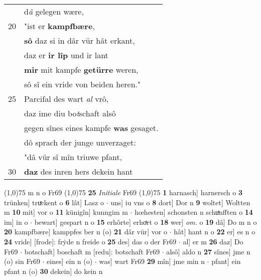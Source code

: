 \documentclass[8pt,a4paper,notitlepage]{article}
\begin{document}
\begin{table}[ht]
\begin{minipage}[t]{0.5\linewidth}
\begin{tabular}{rl}
 & d\textit{â} gelegen wære,\\ 
20 & "ist er \textbf{kampfbære},\\ 
 & \textbf{sô} daz si in dâr vür hât erkant,\\ 
 & daz er \textbf{ir lîp} und ir lant\\ 
 & \textbf{mir} mit kampfe \textbf{getürre} weren,\\ 
 & sô sî ein vride von beiden heren."\\ 
25 & Parcifal des wart \textit{al} vrô,\\ 
 & daz ime diu bo\textit{t}schaft alsô\\ 
 & gegen sînes eines kampfe \textbf{was} gesaget.\\ 
 & dô sprach der junge unverzaget:\\ 
 & "dâ vür sî mîn triuwe pfant,\\ 
30 & \textbf{daz} des inren hers dekein hant\\ 
\end{tabular}
\scriptsize
\line(1,0){75} \newline
m n o Fr69 \newline
\line(1,0){75} \newline
\textbf{25} \textit{Initiale} Fr69  \newline
\line(1,0){75} \newline
\textbf{1} harnasch] harnersch o \textbf{3} trünken] truͯckent o \textbf{6} lât] Lasz o  $\cdot$ uns] iu vns o \textbf{8} dort] Dor n \textbf{9} woltet] Woltten m \textbf{10} mit] vor o \textbf{11} künigîn] kunngim m  $\cdot$ hœhesten] schonsten n schuͯnfften o \textbf{14} im] in o  $\cdot$ bewart] gespart n o \textbf{15} erhôrte] erhoͯrt o \textbf{18} wer] \textit{om.} o \textbf{19} dâ] Do m n o \textbf{20} kampfbære] kamppfes ber n (o) \textbf{21} dâr vür] vor o  $\cdot$ hât] hant n o \textbf{22} er] es n o \textbf{24} vride] [frode]: frẏde n freide o \textbf{25} des] das o der Fr69  $\cdot$ al] er m \textbf{26} daz] Do Fr69  $\cdot$ botschaft] boschaft m [redu]: botschaft Fr69  $\cdot$ alsô] aldo n \textbf{27} sînes] jme n (o) sin Fr69  $\cdot$ eines] ein n (o)  $\cdot$ was] wart Fr69 \textbf{29} mîn] jme min n  $\cdot$ pfant] ein pfant n (o) \textbf{30} dekein] do kein n \newline
\end{minipage}
\end{table}
\newpage
\end{document}
